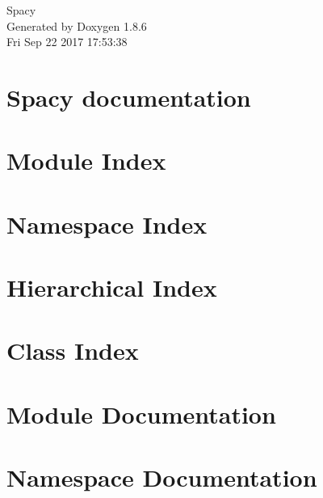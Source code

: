 \documentclass[twoside]{book}
\newcommand{\clearemptydoublepage}{%
  \newpage{\pagestyle{empty}\cleardoublepage}%
}
\begin{document}
\hypersetup{pageanchor=false}
\begin{titlepage}
\vspace*{7cm}
\begin{center}%
{\Large Spacy }\\
\vspace*{1cm}
{\large Generated by Doxygen 1.8.6}\\
\vspace*{0.5cm}
{\small Fri Sep 22 2017 17:53:38}\\
\end{center}
\end{titlepage}
\clearemptydoublepage
\tableofcontents
\clearemptydoublepage
{}
\hypersetup{pageanchor=true}

\chapter{Spacy documentation}
\label{index}\hypertarget{index}{}
\chapter{Module Index}

\chapter{Namespace Index}

\chapter{Hierarchical Index}

\chapter{Class Index}

\chapter{Module Documentation}













\chapter{Namespace Documentation}
















\end{document}
